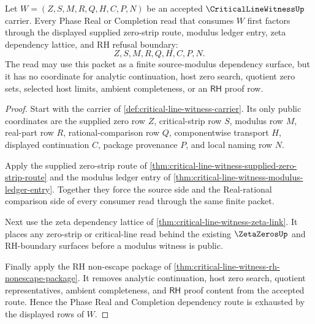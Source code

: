 \begin{theorem}
\label{thm:critical-line-witness-phase-real-dependency-totality}
Let $W=(Z,S,M,R,Q,H,C,P,N)$ be an accepted $\CriticalLineWitnessUp$ carrier. Every Phase Real or Completion read that consumes $W$ first factors through the displayed supplied zero-strip route, modulus ledger entry, zeta dependency lattice, and RH refusal boundary:
$$
Z,S,M,R,Q,H,C,P,N.
$$
The read may use this packet as a finite source-modulus dependency surface, but it has no coordinate for analytic continuation, host zero search, quotient zero sets, selected host limits, ambient completeness, or an $\mathsf{RH}$ proof row.
\end{theorem}
\begin{proof}
Start with the carrier of \autoref{def:critical-line-witness-carrier}. Its only public coordinates are the supplied zero row $Z$, critical-strip row $S$, modulus row $M$, real-part row $R$, rational-comparison row $Q$, componentwise transport $H$, displayed continuation $C$, package provenance $P$, and local naming row $N$.

Apply the supplied zero-strip route of \autoref{thm:critical-line-witness-supplied-zero-strip-route} and the modulus ledger entry of \autoref{thm:critical-line-witness-modulus-ledger-entry}. Together they force the source side and the Real-rational comparison side of every consumer read through the same finite packet.

Next use the zeta dependency lattice of \autoref{thm:critical-line-witness-zeta-link}. It places any zero-strip or critical-line read behind the existing $\ZetaZerosUp$ and RH-boundary surfaces before a modulus witness is public.

Finally apply the RH non-escape package of \autoref{thm:critical-line-witness-rh-nonescape-package}. It removes analytic continuation, host zero search, quotient representatives, ambient completeness, and $\mathsf{RH}$ proof content from the accepted route. Hence the Phase Real and Completion dependency route is exhausted by the displayed rows of $W$.
\end{proof}

